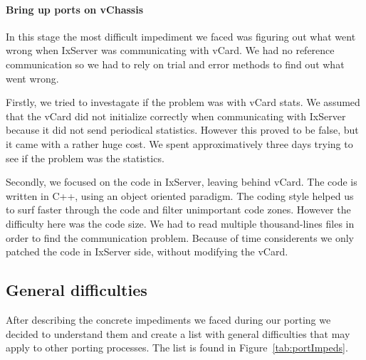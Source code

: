\paragraph{Bring up ports on vChassis}

In this stage the most difficult impediment we faced was figuring out what went
wrong when IxServer was communicating with vCard. We had no reference
communication so we had to rely on trial and error methods to find out what went
wrong.

Firstly, we tried to investagate if the problem was with vCard stats. We assumed
that the vCard did not initialize correctly when communicating with IxServer
because it did not send periodical statistics. However this proved to be false,
but it came with a rather huge cost. We spent approximatively three days trying
to see if the problem was the statistics.

Secondly, we focused on the code in IxServer, leaving behind vCard. The code is
written in C++, using an object oriented paradigm. The coding style helped us
to surf faster through the code and filter unimportant code zones. However the
difficulty here was the code size. We had to read multiple thousand-lines files
in order to find the communication problem. Because of time considerents we
only patched the code in IxServer side, without modifying the vCard.

\subsection{General difficulties}

After describing the concrete impediments we faced during our porting we decided
to understand them and create a list with general difficulties that may apply
to other porting processes. The list is found in Figure~\ref{tab:portImpeds}.

